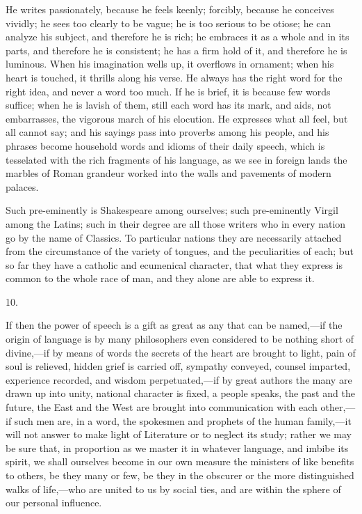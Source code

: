 He writes passionately, because he feels keenly; forcibly, because
he conceives vividly; he sees too clearly to be vague; he is too
serious to be otiose; he can analyze his subject, and therefore he is
rich; he embraces it as a whole and in its parts, and therefore he is
consistent; he has a firm hold of it, and therefore he is luminous.
When his imagination wells up, it overflows in ornament; when his
heart is touched, it thrills along his verse. He always has the right
word for the right idea, and never a word too much. If he is brief, it
is because few words suffice; when he is lavish of them, still each
word has its mark, and aids, not embarrasses, the vigorous march of
his elocution. He expresses what all feel, but all cannot say; and his
sayings pass into proverbs among his people, and his phrases become
household words and idioms of their daily speech, which is
tesselated with the rich fragments of his language, as we see in
foreign lands the marbles of Roman grandeur worked into the walls and
pavements of modern palaces.

Such pre-eminently is Shakespeare among ourselves; such
pre-eminently Virgil among the Latins; such in their degree are all
those writers who in every nation go by the name of Classics. To
particular nations they are necessarily attached from the circumstance
of the variety of tongues, and the peculiarities of each; but so far
they have a catholic and ecumenical character, that what they express
is common to the whole race of man, and they alone are able to express
it.

10.

If then the power of speech is a gift as great as any that can be
named,—if the origin of language is by many philosophers even
considered to be nothing short of divine,—if by means of words the
secrets of the heart are brought to light, pain of soul is relieved,
hidden grief is carried off, sympathy conveyed, counsel imparted,
experience recorded, and wisdom perpetuated,—if by great authors the
many are drawn up into unity, national character is fixed, a people
speaks, the past and the future, the East and the West are brought
into communication with each other,—if such men are, in a word, the
spokesmen and prophets of the human family,—it will not answer to
make light of Literature or to neglect its study; rather we may be
sure that, in proportion as we master it in whatever language, and
imbibe its spirit, we shall ourselves become in our own measure the
ministers of like benefits to others, be they many or few, be
they in the obscurer or the more distinguished walks of life,—who
are united to us by social ties, and are within the sphere of our
personal influence.

